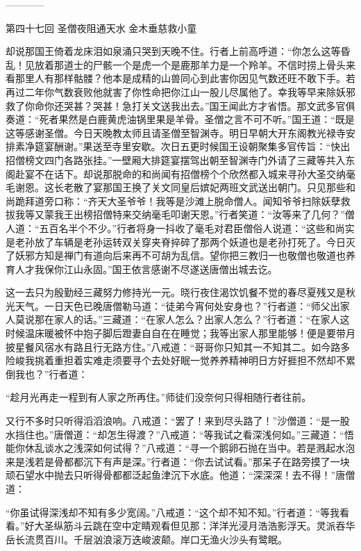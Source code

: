 \documentclass[12pt,UTF8]{ctexbook}
\begin{document}
------------

第四十七回 圣僧夜阻通天水 金木垂慈救小童

却说那国王倚着龙床泪如泉涌只哭到天晚不住。行者上前高呼道：“你怎么这等昏乱！见放着那道士的尸骸一个是虎一个是鹿那羊力是一个羚羊。不信时捞上骨头来看那里人有那样骷髅？他本是成精的山兽同心到此害你因见气数还旺不敢下手。若再过二年你气数衰败他就害了你性命把你江山一股儿尽属他了。幸我等早来除妖邪救了你命你还哭甚？哭甚！急打关文送我出去。”国王闻此方才省悟。那文武多官俱奏道：“死者果然是白鹿黄虎油锅里果是羊骨。圣僧之言不可不听。”国王道：“既是这等感谢圣僧。今日天晚教太师且请圣僧至智渊寺。明日早朝大开东阁教光禄寺安排素净筵宴酬谢。”果送至寺里安歇。次日五更时候国王设朝聚集多官传旨：“快出招僧榜文四门各路张挂。”一壁厢大排筵宴摆驾出朝至智渊寺门外请了三藏等共入东阁赴宴不在话下。却说那脱命的和尚闻有招僧榜个个欣然都入城来寻孙大圣交纳毫毛谢恩。这长老散了宴那国王换了关文同皇后嫔妃两班文武送出朝门。只见那些和尚跪拜道旁口称：“齐天大圣爷爷！我等是沙滩上脱命僧人。闻知爷爷扫除妖孽救拔我等又蒙我王出榜招僧特来交纳毫毛叩谢天恩。”行者笑道：“汝等来了几何？”僧人道：“五百名半个不少。”行者将身一抖收了毫毛对君臣僧俗人说道：“这些和尚实是老孙放了车辆是老孙运转双关穿夹脊捽碎了那两个妖道也是老孙打死了。今日灭了妖邪方知是禅门有道向后来再不可胡为乱信。望你把三教归一也敬僧也敬道也养育人才我保你江山永固。”国王依言感谢不尽遂送唐僧出城去讫。

这一去只为殷勤经三藏努力修持光一元。晓行夜住渴饮饥餐不觉的春尽夏残又是秋光天气。一日天色已晚唐僧勒马道：“徒弟今宵何处安身也？”行者道：“师父出家人莫说那在家人的话。”三藏道：“在家人怎么？出家人怎么？”行者道：“在家人这时候温床暖被怀中抱子脚后蹬妻自自在在睡觉；我等出家人那里能够！便是要带月披星餐风宿水有路且行无路方住。”八戒道：“哥哥你只知其一不知其二。如今路多险峻我挑着重担着实难走须要寻个去处好眠一觉养养精神明日方好捱担不然却不累倒我也？”行者道：

“趁月光再走一程到有人家之所再住。”师徒们没奈何只得相随行者往前。

又行不多时只听得滔滔浪响。八戒道：“罢了！来到尽头路了！”沙僧道：“是一股水挡住也。”唐僧道：“却怎生得渡？”八戒道：“等我试之看深浅何如。”三藏道：“悟能你休乱谈水之浅深如何试得？”八戒道：“寻一个鹅卵石抛在当中。若是溅起水泡来是浅若是骨都都沉下有声是深。”行者道：“你去试试看。”那呆子在路旁摸了一块顽石望水中抛去只听得骨都都泛起鱼津沉下水底。他道：“深深深！去不得！”唐僧道：

“你虽试得深浅却不知有多少宽阔。”八戒道：“这个却不知不知。”行者道：“等我看看。”好大圣纵筋斗云跳在空中定睛观看但见那：洋洋光浸月浩浩影浮天。灵派吞华岳长流贯百川。千层汹浪滚万迭峻波颠。岸口无渔火沙头有鹭眠。
\end{document}
